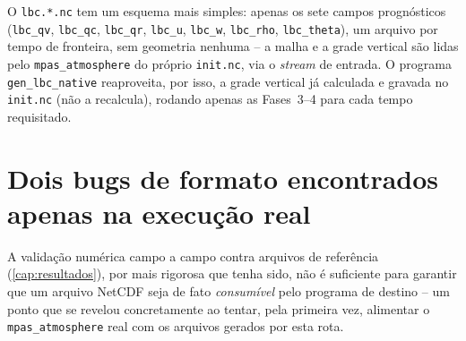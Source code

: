 O \texttt{lbc.*.nc} tem um esquema mais simples: apenas os sete campos
prognósticos (\texttt{lbc\_qv}, \texttt{lbc\_qc}, \texttt{lbc\_qr},
\texttt{lbc\_u}, \texttt{lbc\_w}, \texttt{lbc\_rho}, \texttt{lbc\_theta}),
um arquivo por tempo de fronteira, sem geometria nenhuma -- a malha e a
grade vertical são lidas pelo \texttt{mpas\_atmosphere} do próprio
\texttt{init.nc}, via o \emph{stream} de entrada. O programa
\texttt{gen\_lbc\_native} reaproveita, por isso, a grade vertical já
calculada e gravada no \texttt{init.nc} (não a recalcula), rodando apenas
as Fases~3--4 para cada tempo requisitado.

\section{Dois bugs de formato encontrados apenas na execução real}
\label{sec:bugs_formato}

A validação numérica campo a campo contra arquivos de referência
(\cref{cap:resultados}), por mais rigorosa que tenha sido, não é
suficiente para garantir que um arquivo NetCDF seja de fato
\emph{consumível} pelo programa de destino -- um ponto que se revelou
concretamente ao tentar, pela primeira vez, alimentar o
\texttt{mpas\_atmosphere} real com os arquivos gerados por esta rota.

